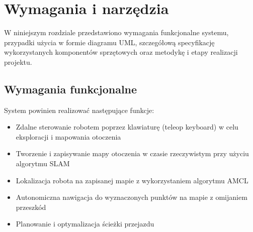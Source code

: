 \documentclass[a4paper,twoside,12pt]{book}
\newtheorem{Definition}{Definicja}
\newtheorem{Example}{Przykład}
\newtheorem{Theorem}{Twierdzenie}
\begin{document}
%
%





\chapter{Wymagania i narzędzia}
\label{ch:wymagania-i-narzedzia}

W niniejszym rozdziale przedstawiono wymagania funkcjonalne systemu, przypadki użycia w formie diagramu UML, szczegółową specyfikację wykorzystanych komponentów sprzętowych oraz metodykę i etapy realizacji projektu.

\section{Wymagania funkcjonalne}
System powinien realizować następujące funkcje:
\begin{itemize}
\item Zdalne sterowanie robotem poprzez klawiaturę (teleop keyboard) w celu eksploracji i mapowania otoczenia
\item Tworzenie i zapisywanie mapy otoczenia w czasie rzeczywistym przy użyciu algorytmu SLAM
\item Lokalizacja robota na zapisanej mapie z wykorzystaniem algorytmu AMCL
\item Autonomiczna nawigacja do wyznaczonych punktów na mapie z omijaniem przeszkód
\item Planowanie i optymalizacja ścieżki przejazdu
\end{itemize}
\end{document}
